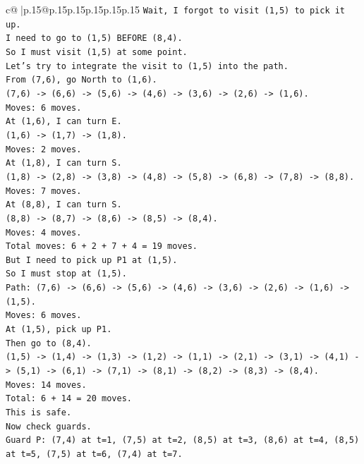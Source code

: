 \documentclass{article}
\begin{document}
{\begin{supertabular}{c@{$\;$}|p{.15\linewidth}@{}p{.15\linewidth}p{.15\linewidth}p{.15\linewidth}p{.15\linewidth}p{.15\linewidth}}
{{{\texttt{Wait, I forgot to visit (1,5) to pick it up.} \\
\texttt{I need to go to (1,5) BEFORE (8,4).} \\
\texttt{So I must visit (1,5) at some point.} \\
\texttt{Let's try to integrate the visit to (1,5) into the path.} \\
\texttt{From (7,6), go North to (1,6).} \\
\texttt{(7,6) {-}> (6,6) {-}> (5,6) {-}> (4,6) {-}> (3,6) {-}> (2,6) {-}> (1,6).} \\
\texttt{Moves: 6 moves.} \\
\texttt{At (1,6), I can turn E.} \\
\texttt{(1,6) {-}> (1,7) {-}> (1,8).} \\
\texttt{Moves: 2 moves.} \\
\texttt{At (1,8), I can turn S.} \\
\texttt{(1,8) {-}> (2,8) {-}> (3,8) {-}> (4,8) {-}> (5,8) {-}> (6,8) {-}> (7,8) {-}> (8,8).} \\
\texttt{Moves: 7 moves.} \\
\texttt{At (8,8), I can turn S.} \\
\texttt{(8,8) {-}> (8,7) {-}> (8,6) {-}> (8,5) {-}> (8,4).} \\
\texttt{Moves: 4 moves.} \\
\texttt{Total moves: 6 + 2 + 7 + 4 = 19 moves.} \\
\texttt{But I need to pick up P1 at (1,5).} \\
\texttt{So I must stop at (1,5).} \\
\texttt{Path: (7,6) {-}> (6,6) {-}> (5,6) {-}> (4,6) {-}> (3,6) {-}> (2,6) {-}> (1,6) {-}> (1,5).} \\
\texttt{Moves: 6 moves.} \\
\texttt{At (1,5), pick up P1.} \\
\texttt{Then go to (8,4).} \\
\texttt{(1,5) {-}> (1,4) {-}> (1,3) {-}> (1,2) {-}> (1,1) {-}> (2,1) {-}> (3,1) {-}> (4,1) {-}> (5,1) {-}> (6,1) {-}> (7,1) {-}> (8,1) {-}> (8,2) {-}> (8,3) {-}> (8,4).} \\
\texttt{Moves: 14 moves.} \\
\texttt{Total: 6 + 14 = 20 moves.} \\
\texttt{This is safe.} \\
\texttt{Now check guards.} \\
\texttt{Guard P: (7,4) at t=1, (7,5) at t=2, (8,5) at t=3, (8,6) at t=4, (8,5) at t=5, (7,5) at t=6, (7,4) at t=7.} \\
}}}
\end{supertabular}}
\end{document}
